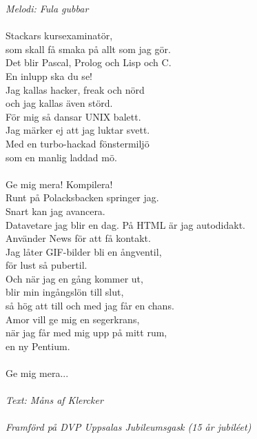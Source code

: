{\footnotesize\textit{Melodi: Fula gubbar}}\\
\\
Stackars kursexaminatör,\\
som skall få smaka på allt som jag gör.\\
Det blir Pascal, Prolog och Lisp och C.\\
En inlupp ska du se!\\
Jag kallas hacker, freak och nörd\\
och jag kallas även störd.\\
För mig så dansar UNIX balett.\\
Jag märker ej att jag luktar svett.\\
Med en turbo-hackad fönstermiljö\\
som en manlig laddad mö.\\
\\
Ge mig mera! Kompilera!\\
Runt på Polacksbacken springer jag.\\
Snart kan jag avancera.\\
Datavetare jag blir en dag.
\newpage
På HTML är jag autodidakt.\\
Använder News för att få kontakt.\\
Jag låter GIF-bilder bli en ångventil,\\
för lust så pubertil.\\
Och när jag en gång kommer ut,\\
blir min ingångslön till slut,\\
så hög att till och med jag får en chans.\\
Amor vill ge mig en segerkrans,\\
när jag får med mig upp på mitt rum,\\
en ny Pentium.\\
\\
Ge mig mera...\\
\\
{\footnotesize\textit{Text: Måns af Klercker\\ \\ Framförd på DVP
      Uppsalas Jubileumsgask (15 år jubiléet)}}
